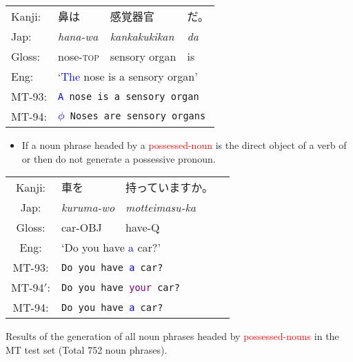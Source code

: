 \documentclass[a4paper,landscape,headrule,footrule,dvips]{foils}
\newcommand{\psp}[1]{\textcolor{purple}{#1}}
\newcommand{\dtr}[1]{\textcolor{blue}{#1}}
\newcommand{\trg}[1]{\textcolor{red}{#1}}
\begin{document}
\begin{CJK}{UTF8}{min}
\begin{exe}
  \ex
\begin{tabular}[t]{llll}
Kanji: &  鼻は &  感覚器官 &  だ。 \\
Jap:   &  \sl hana-wa &  \sl kankakukikan & \sl da  \\
Gloss: &   nose-\textsc{top} &  sensory organ &  is  \\
Eng:   & \multicolumn{3}{l}{`\dtr{The} nose is a sensory organ'} \\
MT-93: & \multicolumn{3}{l}{\tt \dtr{A} nose is a sensory organ} \\
MT-94: & \multicolumn{3}{l}{\tt \dtr{$\phi$} Noses are sensory organs}
\end{tabular}
\end{exe}



\begin{itemize}
\item If a noun phrase headed by a \trg{possessed-noun} is the direct object
  of a verb of  or  then do not
  generate a possessive pronoun.
\end{itemize}

\begin{exe} 
\ex
\begin{tabular}[t]{clll}
Kanji: &  車を &  持っていますか。\\
Jap:   &  \sl kuruma-wo & \sl motteimasu-ka  \\
Gloss: &  car-{\sc OBJ} &  have-{\sc Q}  \\
Eng:   & \multicolumn{2}{l}{`Do you have \dtr{a} car?'} \\
MT-93: & \multicolumn{2}{l}{\tt Do you have \dtr{a} car?} \\
MT-94$'$: & \multicolumn{2}{l}{\tt Do you have \psp{your} car?} \\
MT-94: & \multicolumn{2}{l}{\tt Do you have \dtr{a} car?}
\end{tabular}
\end{exe}



Results of the generation of all noun phrases headed by
\trg{possessed-nouns} in the MT test set (Total 752 noun phrases).


\end{CJK}
\end{document}
